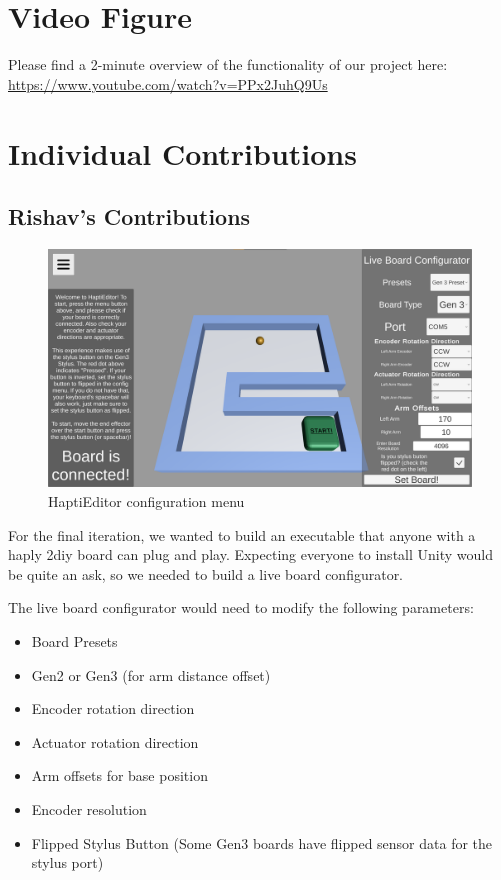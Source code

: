 \appendix

\section{Video Figure}

Please find a 2-minute overview of the functionality of our project here: \href{https://www.youtube.com/watch?v=PPx2JuhQ9Us}{https://www.youtube.com/watch?v=PPx2JuhQ9Us}

\section{Individual Contributions}

\subsection{Rishav's Contributions}

\begin{figure}[htp]
    \centering
    \includegraphics[width=14cm]{images/appendix-menu.png}
    \caption{HaptiEditor configuration menu}
    \label{fig:menu}
\end{figure}

For the final iteration, we wanted to build an executable that anyone with a haply 2diy board can plug and play. Expecting everyone to install Unity would be quite an ask, so we needed to build a live board configurator.

The live board configurator would need to modify the following parameters:
\begin{itemize}
    \item Board Presets
    \item Gen2 or Gen3 (for arm distance offset)
    \item Encoder rotation direction
    \item Actuator rotation direction
    \item Arm offsets for base position
    \item Encoder resolution
    \item Flipped Stylus Button (Some Gen3 boards have flipped sensor data for the stylus port)
\end{itemize}

